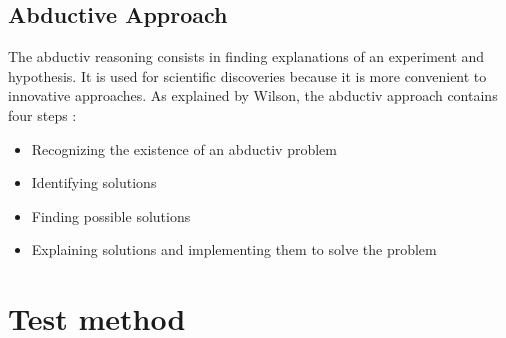 \subsection{Abductive Approach}
The abductiv reasoning consists in finding explanations of an experiment and hypothesis. It is used for scientific discoveries because it is more convenient to innovative approaches. As explained by Wilson, the abductiv approach contains four steps :
\begin{itemize}
\item Recognizing the existence of an abductiv problem
\item Identifying solutions
\item Finding possible solutions
\item Explaining solutions and implementing them to solve the problem %
\end{itemize}


\section{Test method}

